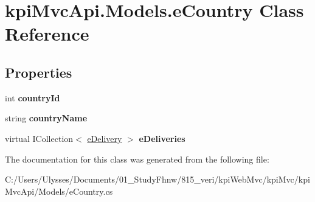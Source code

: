 \hypertarget{classkpi_mvc_api_1_1_models_1_1e_country}{}\section{kpi\+Mvc\+Api.\+Models.\+e\+Country Class Reference}
\label{classkpi_mvc_api_1_1_models_1_1e_country}
\subsection*{Properties}
\begin{DoxyCompactItemize}
\item 
\mbox{\label{classkpi_mvc_api_1_1_models_1_1e_country_a574bfeec30235e95f5c84a3c4d2cf778}} 
int {\bfseries country\+Id}
\item 
\mbox{\label{classkpi_mvc_api_1_1_models_1_1e_country_a2841c06a0b82ebf3c7b005bd1bc27b62}} 
string {\bfseries country\+Name}
\item 
\mbox{\label{classkpi_mvc_api_1_1_models_1_1e_country_ac083fe5c2a911beb1edf6a95ec451278}} 
virtual I\+Collection$<$ \hyperlink{classkpi_mvc_api_1_1_models_1_1e_delivery}{e\+Delivery} $>$ {\bfseries e\+Deliveries}
\end{DoxyCompactItemize}


The documentation for this class was generated from the following file\+:\begin{DoxyCompactItemize}
\item 
C\+:/\+Users/\+Ulysses/\+Documents/01\+\_\+\+Study\+Fhnw/815\+\_\+veri/kpi\+Web\+Mvc/kpi\+Mvc/kpi\+Mvc\+Api/\+Models/e\+Country.\+cs\end{DoxyCompactItemize}
